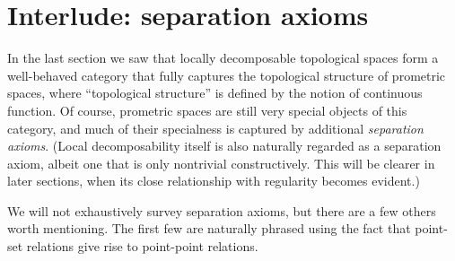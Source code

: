 \documentclass{article}
\begin{document}
\section{Interlude: separation axioms}
\label{sec:separation}

In the last section we saw that locally decomposable topological spaces form a well-behaved category that fully captures the topological structure of prometric spaces, where ``topological structure'' is defined by the notion of continuous function.
Of course, prometric spaces are still very special objects of this category, and much of their specialness is captured by additional \emph{separation axioms}.
(Local decomposability itself is also naturally regarded as a separation axiom, albeit one that is only nontrivial constructively.
This will be clearer in later sections, when its close relationship with regularity becomes evident.)

We will not exhaustively survey separation axioms, but there are a few others worth mentioning.
The first few are naturally phrased using the fact that point-set relations give rise to point-point relations.
\end{document}

